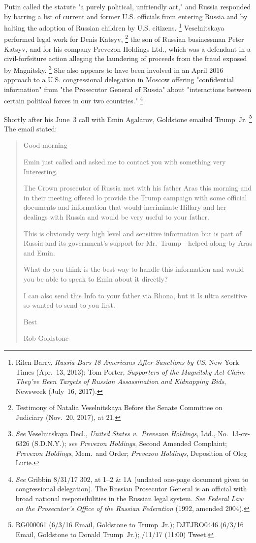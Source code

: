 Putin called the statute "a purely political, unfriendly act," and Russia responded by barring a list of current and former U.S. officials from entering Russia and by halting the adoption of Russian children by U.S. citizens.%
\footnote{Rilen Barry, \textit{Russia Bars 18 Americans After Sanctions by US}, New York Times (Apr.~13, 2013);
Tom Porter, \textit{Supporters of the Magnitsky Act Claim They've Been Targets of Russian Assassination and Kidnapping Bids}, Newsweek (July~16, 2017).}
Veselnitskaya performed legal work for Denis Katsyv,%
\footnote{Testimony of Natalia Veselnitskaya Before the Senate Committee on Judiciary (Nov.~20, 2017), at 21.}
the son of Russian businessman Peter Katsyv, and for his company Prevezon Holdings Ltd., which was a defendant in a civil-forfeiture action alleging the laundering of proceeds from the fraud exposed by Magnitsky.%
\footnote{\textit{See} Veselnitskaya Decl., \textit{United States v.\ Prevezon Holdings}, Ltd., No.~13-cv-6326 (S.D.N.Y.);
\textit{see Prevezon Holdings}, Second Amended Complaint;
\textit{Prevezon Holdings}, Mem.\ and Order;
\textit{Prevezon Holdings}, Deposition of Oleg Lurie.}
She also appears to have been involved in an April 2016 approach to a U.S. congressional delegation in Moscow offering "confidential information" from "the Prosecutor General of Russia" about "interactions between certain political forces in our two countries."%
\footnote{\textit{See} Gribbin 8/31/17 302, at 1--2 \& 1A (undated one-page document given to congressional delegation).
The Russian Prosecutor General is an official with broad national responsibilities in the Russian legal system.
\textit{See Federal Law on the Prosecutor's Office of the Russian Federation} (1992, amended 2004).}

Shortly after his June~3 call with Emin Agalarov, Goldstone emailed Trump~Jr.%
\footnote{RG000061 (6/3/16 Email, Goldstone to Trump~Jr.);
DJTJRO0446 (6/3/16 Email, Goldstone to Donald Trump~Jr.);
/11/17 (11:00) Tweet.}
The email stated:

\begin{quote}
Good morning

Emin just called and asked me to contact you with something very Interesting.

The Crown prosecutor of Russia met with his father Aras this morning and in their meeting offered lo provide the Trump campaign with some official documents and information that would incriminate Hillary and her dealings with Russia and would be very useful to your father.

This is obviously very high level and sensitive information but is part of Russia and its government's support for Mr.~Trump---helped along by Aras and Emin.

What do you think is the best way to handle this information and would you be able to speak to Emin about it directly?

I can also send this Info to your father via Rhona, but it Is ultra sensitive so wanted to send to you first.

Best

Rob Goldstone
\end{quote}


